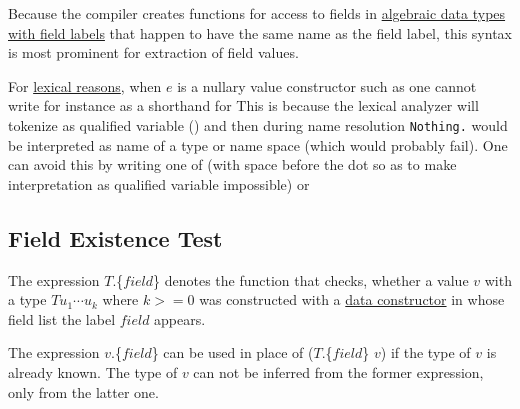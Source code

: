 Because the compiler creates functions for access to fields in \hyperref[fieldconstructor]{algebraic data types with field labels} that happen to have the same name as the field label, this syntax is most prominent for extraction of field values.

\label{confusedots}For \hyperref[qualified names]{lexical reasons}, when $e$ is a nullary value constructor such as  one cannot write for instance  as a shorthand for 
This is because the lexical analyzer will tokenize 
 as qualified variable ()
and then during name resolution \texttt{Nothing.} would be interpreted as name of a type or name space (which would probably fail).
One can avoid this by writing one of  (with space before the dot so as to make interpretation as qualified variable impossible) or 

\subsection{Field Existence Test} \label{field existence}

The expression $T$.\{$field$\} denotes the function that checks, whether a value $v$ with a type $T u_1 \cdots u_k$  where $k>=0$ was constructed with a \hyperref[fieldconstructor]{data constructor} in whose field list the label $field$ appears.

The expression $v$.\{$field$\} can be used in place of  ($T$.\{$field$\} $v$) if the type of $v$ is already known. The type of $v$ can not be inferred from the former expression, only from the latter one.


